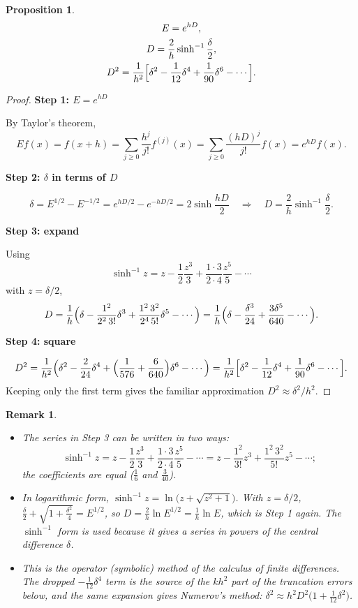 \documentclass[11pt,a4paper]{article}
\numberwithin{equation}{section}
\theoremstyle{spacedplain}
\newtheorem{proposition}[theorem]{Proposition}
\theoremstyle{spaceddefinition}
\theoremstyle{spacedremark}
\newtheorem{remark}[theorem]{Remark}
\newcommand{\step}[1]{\par\addvspace{0.6em}\noindent\textbf{#1}\par\nobreak}
\begin{document}
\begin{keybox}
\begin{proposition}\label{prop:sinh}
\[
\begin{gathered}
  E=e^{hD},
  \\
  D=\frac2h\sinh^{-1}\frac\delta2,
  \\
  D^2=\frac1{h^2}\Bigl[\delta^2-\frac1{12}\delta^4+\frac1{90}\delta^6
      -\cdots\Bigr].
\end{gathered}
\]
\end{proposition}
\end{keybox}

\begin{proof}\leavevmode
\step{Step 1: \(E=e^{hD}\)}
By Taylor's theorem,
\[
  Ef(x)=f(x+h)
  =\sum_{j\ge0}\frac{h^j}{j!}f^{(j)}(x)
  =\sum_{j\ge0}\frac{(hD)^j}{j!}f(x)
  =e^{hD}f(x).
\]

\step{Step 2: \(\delta\) in terms of \(D\)}

\[
  \delta=E^{1/2}-E^{-1/2}=e^{hD/2}-e^{-hD/2}=2\sinh\frac{hD}{2}
  \quad\Longrightarrow\quad
  D=\frac2h\sinh^{-1}\frac\delta2 .
\]

\step{Step 3: expand}
Using
\[
  \sinh^{-1}z=z-\frac12\frac{z^3}{3}+\frac{1\cdot3}{2\cdot4}\frac{z^5}{5}-\cdots
\]
with \(z=\delta/2\),
\[
  D=\frac1h\Bigl(\delta-\frac{1^2}{2^2\,3!}\delta^3
     +\frac{1^2\,3^2}{2^4\,5!}\delta^5-\cdots\Bigr)
   =\frac1h\Bigl(\delta-\frac{\delta^3}{24}+\frac{3\delta^5}{640}-\cdots\Bigr).
\]

\step{Step 4: square}

\[
  D^2=\frac1{h^2}\Bigl(\delta^2-\frac2{24}\delta^4
      +\Bigl(\frac1{576}+\frac{6}{640}\Bigr)\delta^6-\cdots\Bigr)
     =\frac1{h^2}\Bigl[\delta^2-\frac1{12}\delta^4+\frac1{90}\delta^6
      -\cdots\Bigr].
\]
Keeping only the first term gives the familiar approximation
\(D^2\approx \delta^2/h^2\).
\end{proof}

\begin{remark}
\leavevmode
\begin{itemize}
  \item The series in Step 3 can be written in two ways:
    \[
      \sinh^{-1}z
      =z-\frac12\frac{z^3}{3}+\frac{1\cdot3}{2\cdot4}\frac{z^5}{5}-\cdots
      =z-\frac{1^2}{3!}z^3+\frac{1^2\,3^2}{5!}z^5-\cdots;
    \]
    the coefficients are equal (\(\frac16\) and \(\frac3{40}\)).
  \item In logarithmic form,
    \(\sinh^{-1}z=\ln\bigl(z+\sqrt{z^2+1}\bigr)\).  With \(z=\delta/2\),
    \(\frac\delta2+\sqrt{1+\frac{\delta^2}4}=E^{1/2}\), so
    \(D=\frac2h\ln E^{1/2}=\frac1h\ln E\), which is Step 1 again.  The
    \(\sinh^{-1}\) form is used because it gives a series in powers of
    the \emph{central} difference \(\delta\).
  \item This is the operator (symbolic) method of the calculus of
    finite differences.  The dropped \(-\frac1{12}\delta^4\) term is
    the source of the \(kh^2\) part of the truncation errors below,
    and the same expansion gives Numerov's method:
    \(\delta^2\approx h^2D^2\bigl(1+\frac1{12}\delta^2\bigr)\).
\end{itemize}
\end{remark}
\end{document}
